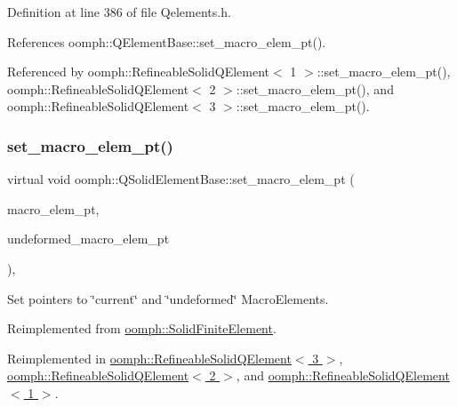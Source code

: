 Definition at line 386 of file Qelements.\+h.



References oomph\+::\+Q\+Element\+Base\+::set\+\_\+macro\+\_\+elem\+\_\+pt().



Referenced by oomph\+::\+Refineable\+Solid\+Q\+Element$<$ 1 $>$\+::set\+\_\+macro\+\_\+elem\+\_\+pt(), oomph\+::\+Refineable\+Solid\+Q\+Element$<$ 2 $>$\+::set\+\_\+macro\+\_\+elem\+\_\+pt(), and oomph\+::\+Refineable\+Solid\+Q\+Element$<$ 3 $>$\+::set\+\_\+macro\+\_\+elem\+\_\+pt().

\mbox{\label{classoomph_1_1QSolidElementBase_aa7f14a039224fb4c513da587448d2c3b}} 
\subsubsection{\texorpdfstring{set\+\_\+macro\+\_\+elem\+\_\+pt()}{set\_macro\_elem\_pt()}\hspace{0.1cm}{\footnotesize\ttfamily [2/2]}}
{\footnotesize\ttfamily virtual void oomph\+::\+Q\+Solid\+Element\+Base\+::set\+\_\+macro\+\_\+elem\+\_\+pt (\begin{DoxyParamCaption}\item[{\hyperlink{classoomph_1_1MacroElement}{Macro\+Element} $\ast$}]{macro\+\_\+elem\+\_\+pt,  }\item[{\hyperlink{classoomph_1_1MacroElement}{Macro\+Element} $\ast$}]{undeformed\+\_\+macro\+\_\+elem\+\_\+pt }\end{DoxyParamCaption})\hspace{0.3cm}{\ttfamily [inline]}, {\ttfamily [virtual]}}



Set pointers to \char`\"{}current\char`\"{} and \char`\"{}undeformed\char`\"{} Macro\+Elements. 



Reimplemented from \hyperlink{classoomph_1_1SolidFiniteElement_a05bdd718a54628b6cf81fc94ad4cb6ab}{oomph\+::\+Solid\+Finite\+Element}.



Reimplemented in \hyperlink{classoomph_1_1RefineableSolidQElement_3_013_01_4_ab2c2950454d7c4ea16a597192c7fae15}{oomph\+::\+Refineable\+Solid\+Q\+Element$<$ 3 $>$}, \hyperlink{classoomph_1_1RefineableSolidQElement_3_012_01_4_a8c0cb9d011cc070322945b1fecd03331}{oomph\+::\+Refineable\+Solid\+Q\+Element$<$ 2 $>$}, and \hyperlink{classoomph_1_1RefineableSolidQElement_3_011_01_4_a9dd7e2622260d14c2bf92125707a3401}{oomph\+::\+Refineable\+Solid\+Q\+Element$<$ 1 $>$}.



